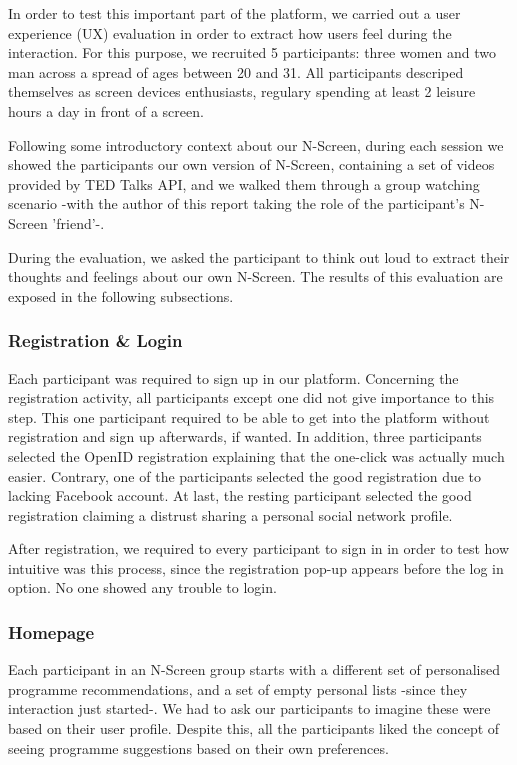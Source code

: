 \documentclass{acm_proc_article-sp}
\begin{document}
In order to test this important part of the platform, we carried out a user experience (UX) evaluation in order to extract how users feel during the interaction. For this purpose, we recruited 5 participants: three women and two man across a spread of ages between 20 and 31. All participants descriped themselves as screen devices enthusiasts, regulary spending at least 2 leisure hours a day in front of a screen. 

Following some introductory context about our N-Screen, during each session we showed the participants our own version of N-Screen, containing a set of videos provided by TED Talks API, and we walked them through a group watching scenario -with the author of this report taking the role of the participant's N-Screen 'friend'-. 

During the evaluation, we asked the participant to think out loud to extract their thoughts and feelings about our own N-Screen. The results of this evaluation are exposed in the following subsections. 

\subsubsection{Registration \& Login}

Each participant was required to sign up in our platform. Concerning the registration activity, all participants except one did not give importance to this step. This one participant required to be able to get into the platform without registration and sign up afterwards, if wanted. In addition, three participants selected the OpenID registration explaining that the one-click was actually much easier. Contrary, one of the participants selected the good registration due to lacking Facebook account. At last, the resting participant selected the good registration claiming a distrust sharing a personal social network profile.  

After registration, we required to every participant to sign in in order to test how intuitive was this process, since the registration pop-up appears before the log in option. No one showed any trouble to login.

\subsubsection{Homepage}

Each participant in an N-Screen group starts with a different set of personalised programme recommendations, and a set of empty personal lists -since they interaction just started-. We had to ask our participants to imagine these were based on their user profile. Despite this, all the participants liked the concept of seeing programme suggestions based on their own preferences.
\end{document}
